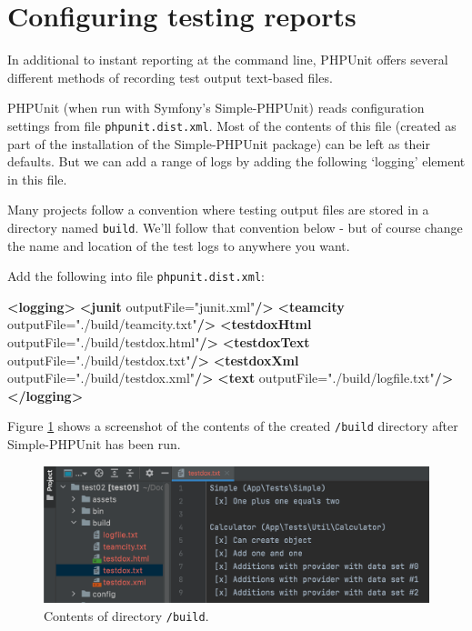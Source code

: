 \documentclass[a4paperpaper,openright]{book}
\newenvironment{Shaded}{}{}
\newcommand{\KeywordTok}[1]{\textcolor[rgb]{0.00,0.44,0.13}{\textbf{#1}}}
\newcommand{\OtherTok}[1]{\textcolor[rgb]{0.00,0.44,0.13}{#1}}
\newcommand{\StringTok}[1]{\textcolor[rgb]{0.25,0.44,0.63}{#1}}
\begin{document}
\hypertarget{configuring-testing-reports}{%
\section{Configuring testing
reports}\label{configuring-testing-reports}}

In additional to instant reporting at the command line, PHPUnit offers
several different methods of recording test output text-based files.

PHPUnit (when run with Symfony's Simple-PHPUnit) reads configuration
settings from file \texttt{phpunit.dist.xml}. Most of the contents of
this file (created as part of the installation of the Simple-PHPUnit
package) can be left as their defaults. But we can add a range of logs
by adding the following `logging' element in this file.

Many projects follow a convention where testing output files are stored
in a directory named \texttt{build}. We'll follow that convention below
- but of course change the name and location of the test logs to
anywhere you want.

Add the following into file \texttt{phpunit.dist.xml}:

\begin{Shaded}
\begin{Highlighting}[]
    \KeywordTok{<logging>}
        \KeywordTok{<junit}\OtherTok{ outputFile=}\StringTok{"junit.xml"}\KeywordTok{/>}
        \KeywordTok{<teamcity}\OtherTok{ outputFile=}\StringTok{"./build/teamcity.txt"}\KeywordTok{/>}
        \KeywordTok{<testdoxHtml}\OtherTok{ outputFile=}\StringTok{"./build/testdox.html"}\KeywordTok{/>}
        \KeywordTok{<testdoxText}\OtherTok{ outputFile=}\StringTok{"./build/testdox.txt"}\KeywordTok{/>}
        \KeywordTok{<testdoxXml}\OtherTok{ outputFile=}\StringTok{"./build/testdox.xml"}\KeywordTok{/>}
        \KeywordTok{<text}\OtherTok{ outputFile=}\StringTok{"./build/logfile.txt"}\KeywordTok{/>}
    \KeywordTok{</logging>}
\end{Highlighting}
\end{Shaded}

Figure \ref{build_contents} shows a screenshot of the contents of the
created \texttt{/build} directory after Simple-PHPUnit has been run.

\begin{figure}
\centering
\includegraphics{./tex2pdf.-05a85d9d563be472/3559f32c2528365c9a16e82840e354027eaf070d.png}
\caption{Contents of directory \texttt{/build}. \label{build_contents}}
\end{figure}
\end{document}
